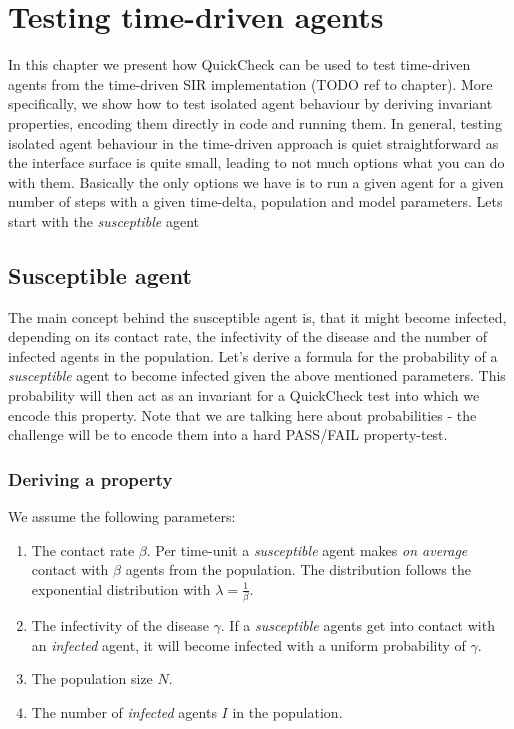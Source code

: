 \chapter{Testing time-driven agents}

In this chapter we present how QuickCheck can be used to test time-driven agents from the time-driven SIR implementation (TODO ref to chapter). More specifically, we show how to test isolated agent behaviour by deriving invariant properties, encoding them directly in code and running them. 
In general, testing isolated agent behaviour in the time-driven approach is quiet straightforward as the interface surface is quite small, leading to not much options what you can do with them. Basically the only options we have is to run a given agent for a given number of steps with a given time-delta, population and model parameters. Lets start with the \textit{susceptible} agent

\section{Susceptible agent}
The main concept behind the susceptible agent is, that it might become infected, depending on its contact rate, the infectivity of the disease and the number of infected agents in the population. Let's derive a formula for the probability of a \textit{susceptible} agent to become infected given the above mentioned parameters. This probability will then act as an invariant for a QuickCheck test into which we encode this property. Note that we are talking here about probabilities - the challenge will be to encode them into a hard PASS/FAIL property-test.

\subsection{Deriving a property}
We assume the following parameters:

\begin{enumerate}
	\item The contact rate $\beta$. Per time-unit a \textit{susceptible} agent makes \textit{on average} contact with $\beta$ agents from the population. The distribution follows the exponential distribution with $\lambda = \frac{1}{\beta}$.
	\item The infectivity of the disease $\gamma$. If a \textit{susceptible} agents get into contact with an \textit{infected} agent, it will become infected with a uniform probability of $\gamma$. 
	\item The population size $N$.
	\item The number of \textit{infected} agents $I$ in the population.
\end{enumerate}

